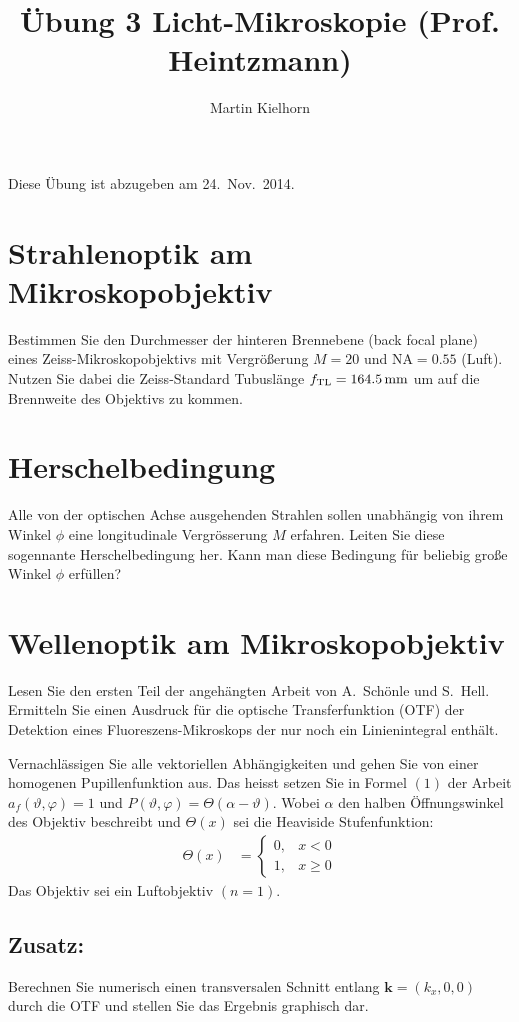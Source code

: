 \documentclass{article}
\begin{document}
\author{Martin Kielhorn}
\title{\"Ubung 3 Licht-Mikroskopie (Prof. Heintzmann)}
\maketitle
\noindent Diese \"Ubung ist abzugeben am 24.~Nov.~2014.

\section{Strahlenoptik am Mikroskopobjektiv}
Bestimmen Sie den Durchmesser der hinteren Brennebene (back focal
plane) eines Zeiss-Mikroskopobjektivs mit Vergr\"o\ss erung $M=20$ und
$\textrm{NA}=0.55$ (Luft). Nutzen Sie dabei die Zeiss-Standard Tubusl\"ange
$f_\textrm{TL}=\unit[164.5]{mm}$ um auf die Brennweite des Objektivs
zu kommen.

\section{Herschelbedingung}
Alle von der optischen Achse ausgehenden Strahlen sollen unabh\"angig
von ihrem Winkel $\phi$ eine longitudinale Vergr\"osserung $M$
erfahren. Leiten Sie diese sogennante Herschelbedingung her. Kann man
diese Bedingung f\"ur beliebig gro\ss e Winkel $\phi$ erf\"ullen?

\section{Wellenoptik am Mikroskopobjektiv}
Lesen Sie den ersten Teil der angeh\"angten Arbeit von A.~Sch\"onle
und S.~Hell. Ermitteln Sie einen Ausdruck f\"ur die optische
Transferfunktion (OTF) der Detektion eines Fluoreszens-Mikroskops der
nur noch ein Linienintegral enth\"alt.

Vernachl\"assigen Sie alle vektoriellen Abh\"angigkeiten und gehen Sie
von einer homogenen Pupillenfunktion aus. Das heisst setzen Sie in
Formel $(1)$ der Arbeit $a_f(\vartheta,\varphi)=1$ und
$P(\vartheta,\varphi)=\Theta(\alpha-\vartheta)$. Wobei $\alpha$ den halben
\"Offnungswinkel des Objektiv beschreibt und $\Theta(x)$ sei die
Heaviside Stufenfunktion:
\begin{align}
  \Theta(x)&=\begin{cases}
  0, & x<0 \\
  1, & x \ge 0
  \end{cases}
\end{align}
Das Objektiv sei ein Luftobjektiv $(n=1)$.

\subsection*{Zusatz:}
Berechnen Sie numerisch einen transversalen Schnitt entlang
$\mathbf{k}=(k_x,0,0)$ durch die OTF und stellen Sie das Ergebnis graphisch dar. %


\end{document}
